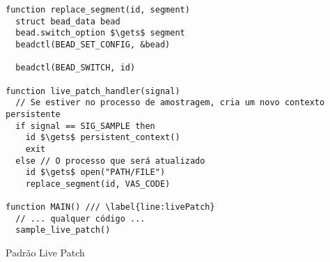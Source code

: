 \begin{pseudocode}
\begin{lstlisting}[language=pseudocode, style=pseudocode]
function replace_segment(id, segment)
  struct bead_data bead
  bead.switch_option $\gets$ segment
  beadctl(BEAD_SET_CONFIG, &bead)

  beadctl(BEAD_SWITCH, id)

function live_patch_handler(signal)
  // Se estiver no processo de amostragem, cria um novo contexto persistente
  if signal == SIG_SAMPLE then
    id $\gets$ persistent_context()
    exit
  else // O processo que será atualizado
    id $\gets$ open("PATH/FILE")
    replace_segment(id, VAS_CODE)

function MAIN() /// \label{line:livePatch}
  // ... qualquer código ...
  sample_live_patch()
\end{lstlisting}

  \caption{Padrão Live Patch}
  \label{alg:livePatch}
\end{pseudocode}
